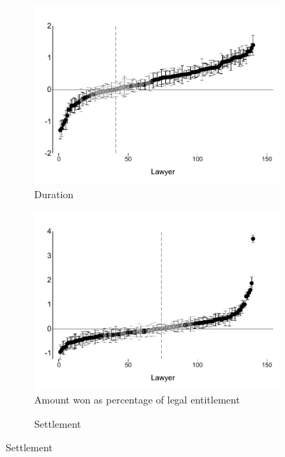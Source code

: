 \documentclass[oneside,11pt]{article}
\begin{document}
\begin{figure}[H]
\begin{center}
\begin{subfigure}{0.49\textwidth}
    \end{subfigure}
    \begin{subfigure}{0.49\textwidth}
        \caption{Duration}
        \centering
        \includegraphics[width=\textwidth]{Figuras/betas_ql_pos_rec.pdf}
    \end{subfigure}    
 \begin{subfigure}{0.49\textwidth}
        \caption{Amount won as percentage of legal entitlement}
        \centering
        \includegraphics[width=\textwidth]{Figuras/betas_ql_win_minley.pdf}
    \end{subfigure}    
 \begin{subfigure}{0.49\textwidth}
        \caption{Settlement}
        \centering

\end{subfigure}
\end{center}
\end{figure}
\end{document}
